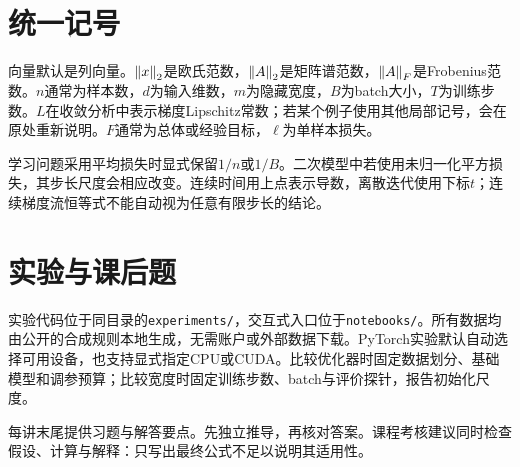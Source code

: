 \section*{统一记号}
向量默认是列向量。$\left\lVert x\right\rVert_2$是欧氏范数，$\left\lVert A\right\rVert_2$是矩阵谱范数，$\left\lVert A\right\rVert_F$是Frobenius范数。$n$通常为样本数，$d$为输入维数，$m$为隐藏宽度，$B$为batch大小，$T$为训练步数。$L$在收敛分析中表示梯度Lipschitz常数；若某个例子使用其他局部记号，会在原处重新说明。$F$通常为总体或经验目标，$\ell$为单样本损失。

学习问题采用平均损失时显式保留$1/n$或$1/B$。二次模型中若使用未归一化平方损失，其步长尺度会相应改变。连续时间用上点表示导数，离散迭代使用下标$t$；连续梯度流恒等式不能自动视为任意有限步长的结论。

\section*{实验与课后题}
实验代码位于同目录的\texttt{experiments/}，交互式入口位于\texttt{notebooks/}。所有数据均由公开的合成规则本地生成，无需账户或外部数据下载。PyTorch实验默认自动选择可用设备，也支持显式指定CPU或CUDA。比较优化器时固定数据划分、基础模型和调参预算；比较宽度时固定训练步数、batch与评价探针，报告初始化尺度。

每讲末尾提供习题与解答要点。先独立推导，再核对答案。课程考核建议同时检查假设、计算与解释：只写出最终公式不足以说明其适用性。
